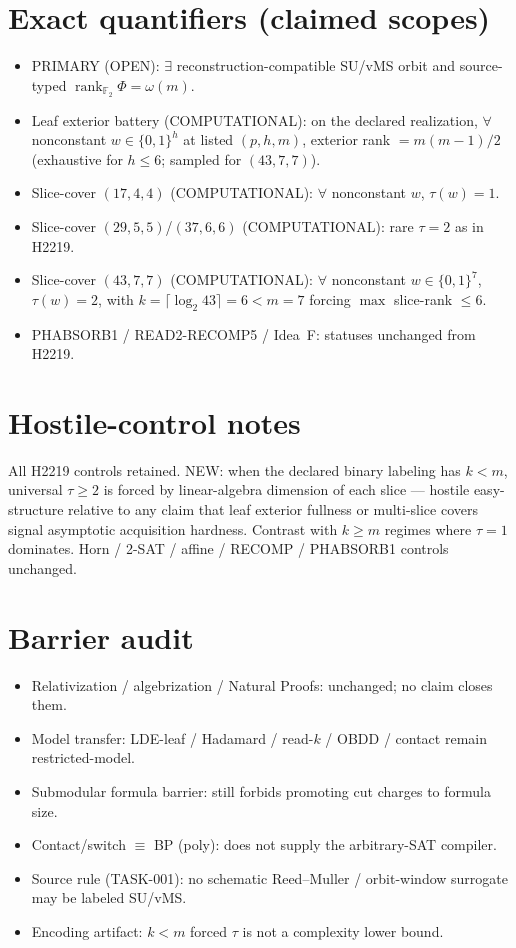 \documentclass[11pt]{article}
\begin{document}
\section*{Exact quantifiers (claimed scopes)}
\begin{itemize}
\item PRIMARY (OPEN): $\exists$ reconstruction-compatible SU/vMS orbit and source-typed
  $\operatorname{rank}_{\mathbb F_2}\Phi=\omega(m)$.
\item Leaf exterior battery (COMPUTATIONAL): on the declared realization, $\forall$ nonconstant
  $w\in\{0,1\}^h$ at listed $(p,h,m)$, exterior rank $=m(m-1)/2$
  (exhaustive for $h\le6$; sampled for $(43,7,7)$).
\item Slice-cover $(17,4,4)$ (COMPUTATIONAL): $\forall$ nonconstant $w$, $\tau(w)=1$.
\item Slice-cover $(29,5,5)$/$(37,6,6)$ (COMPUTATIONAL): rare $\tau{=}2$ as in H2219.
\item Slice-cover $(43,7,7)$ (COMPUTATIONAL): $\forall$ nonconstant $w\in\{0,1\}^7$,
  $\tau(w)=2$, with $k=\lceil\log_2 43\rceil=6<m=7$ forcing $\max$ slice-rank $\le6$.
\item PHABSORB1 / READ2-RECOMP5 / Idea~F: statuses unchanged from H2219.
\end{itemize}

\section*{Hostile-control notes}
All H2219 controls retained. NEW: when the declared binary labeling has $k<m$,
universal $\tau\ge 2$ is forced by linear-algebra dimension of each slice --- hostile
easy-structure relative to any claim that leaf exterior fullness or multi-slice covers
signal asymptotic acquisition hardness. Contrast with $k\ge m$ regimes where $\tau{=}1$
dominates. Horn / 2-SAT / affine / RECOMP / PHABSORB1 controls unchanged.

\section*{Barrier audit}
\begin{itemize}
\item Relativization / algebrization / Natural Proofs: unchanged; no claim closes them.
\item Model transfer: LDE-leaf / Hadamard / read-$k$ / OBDD / contact remain restricted-model.
\item Submodular formula barrier: still forbids promoting cut charges to formula size.
\item Contact/switch $\equiv$ BP (poly): does not supply the arbitrary-SAT compiler.
\item Source rule (TASK-001): no schematic Reed--Muller / orbit-window surrogate may be labeled SU/vMS.
\item Encoding artifact: $k{<}m$ forced $\tau$ is not a complexity lower bound.
\end{itemize}
\end{document}
